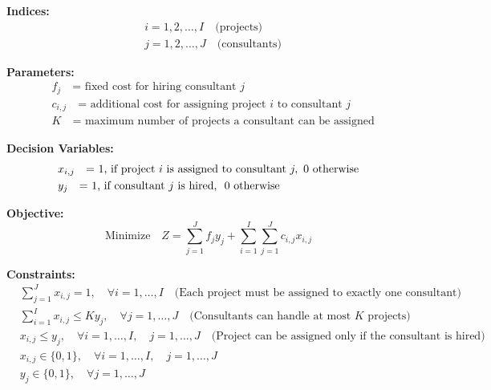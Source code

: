 \documentclass{article}
\begin{document}
\textbf{Indices:}
\begin{align*}
& i = 1, 2, \ldots, I \quad \text{(projects)} \\
& j = 1, 2, \ldots, J \quad \text{(consultants)}
\end{align*}

\textbf{Parameters:}
\begin{align*}
& f_j \quad \text{= fixed cost for hiring consultant } j \\
& c_{i,j} \quad \text{= additional cost for assigning project } i \text{ to consultant } j \\
& K \quad \text{= maximum number of projects a consultant can be assigned}
\end{align*}

\textbf{Decision Variables:}
\begin{align*}
& x_{i,j} \quad \text{= 1, if project } i \text{ is assigned to consultant } j, \text{ 0 otherwise} \\
& y_j \quad \text{= 1, if consultant } j \text{ is hired, \text{ 0 otherwise}}
\end{align*}

\textbf{Objective:}
\[
\text{Minimize} \quad Z = \sum_{j=1}^J f_j y_j + \sum_{i=1}^I \sum_{j=1}^J c_{i,j} x_{i,j}
\]

\textbf{Constraints:}
\begin{align*}
& \sum_{j=1}^J x_{i,j} = 1, \quad \forall i = 1, \ldots, I \quad \text{(Each project must be assigned to exactly one consultant)} \\
& \sum_{i=1}^I x_{i,j} \leq K y_j, \quad \forall j = 1, \ldots, J \quad \text{(Consultants can handle at most } K \text{ projects)} \\
& x_{i,j} \leq y_j, \quad \forall i = 1, \ldots, I, \quad j = 1, \ldots, J \quad \text{(Project can be assigned only if the consultant is hired)} \\
& x_{i,j} \in \{0, 1\}, \quad \forall i = 1, \ldots, I, \quad j = 1, \ldots, J \\
& y_j \in \{0, 1\}, \quad \forall j = 1, \ldots, J
\end{align*}
\end{document}
